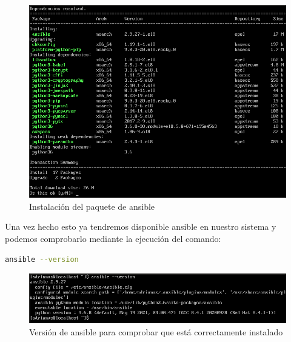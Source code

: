 \begin{figure}[H]
	\centering
	\includegraphics[scale=0.4]{graphics/img14}
	\caption{Instalación del paquete de ansible}
\end{figure}

Una vez hecho esto ya tendremos disponible ansible en nuestro sistema y podemos comprobarlo mediante la ejecución del comando:

\begin{lstlisting}[language=bash]
	ansible --version
\end{lstlisting}

\begin{figure}[H]
	\centering
	\includegraphics[scale=0.4]{graphics/img15}
	\caption{Versión de ansible para comprobar que está correctamente instalado}
\end{figure}

\newpage
